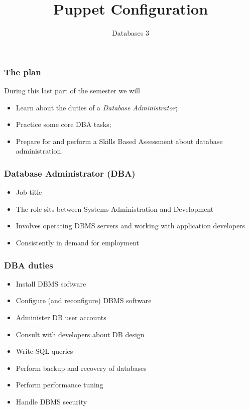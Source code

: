 \documentclass[10pt]{beamer}
\title{Puppet Configuration}
\author[IN705]{Databases 3}
\institute[Otago Polytechnic]{
  School of Information Technology \\
  Otago Polytechnic \\
  Dunedin, New Zealand \\
}
\date{}
\begin{document}
\begin{frame}[plain]
  \titlepage
\end{frame}

\begin{frame}
  \frametitle{The plan}
 During this last part of the semester we will 
 \begin{itemize}
  \item Learn about the duties of a \emph{Database Administrator};
  \item Practice some core DBA tasks;
  \item Prepare for and perform a Skills Based Assessment about database administration.
  \end{itemize}


\end{frame}

\begin{frame}
  \frametitle{Database Administrator (DBA)}
 
 \begin{itemize}
  \item Job title
  \item The role sits between Systems Administration and Development
  \item Involves operating DBMS servers and working with application developers
  \item Consistently in demand for employment
  \end{itemize}

  

\end{frame}

\begin{frame}
  \frametitle{DBA duties}
 
 \begin{itemize}
  \item Install DBMS software
  \item Configure (and reconfigure) DBMS software
  \item Administer DB user accounts
  \item Consult with developers about DB design
  \item Write SQL queries
  \item Perform backup and recovery of databases
  \item Perform performance tuning
  \item Handle DBMS security
  \end{itemize}

  
\end{frame}
\end{document}
